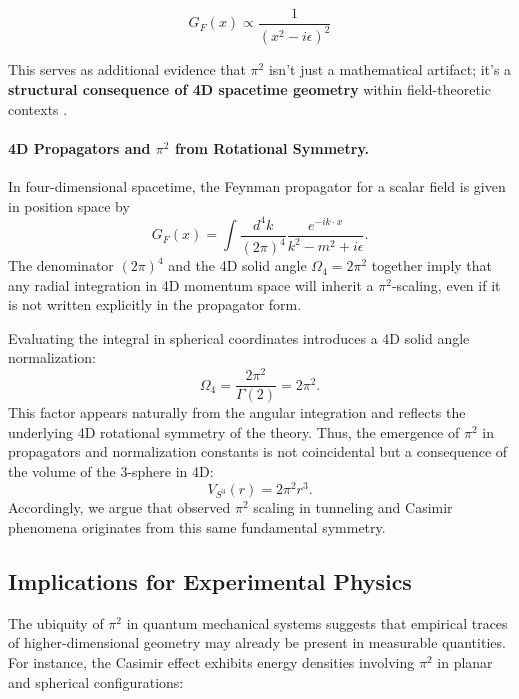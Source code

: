 \documentclass[12pt,a4paper]{article}
\begin{document}
\begin{equation}
G_F(x) \propto \frac{1}{(x^2 - i\epsilon)^2}
\end{equation}

This serves as additional evidence that $\pi^2$ isn't just a mathematical artifact; it's a \textbf{structural consequence of 4D spacetime geometry} within field-theoretic contexts \cite{peskin_introduction_1995}.

\paragraph{4D Propagators and $\pi^2$ from Rotational Symmetry.}
In four-dimensional spacetime, the Feynman propagator for a scalar field is given in position space by
\begin{equation}
G_F(x) = \int \frac{d^4k}{(2\pi)^4} \frac{e^{-i k \cdot x}}{k^2 - m^2 + i\epsilon}.
\end{equation}
The denominator \((2\pi)^4\) and the 4D solid angle \(\Omega_4 = 2\pi^2\) together imply that any radial integration in 4D momentum space will inherit a \(\pi^2\)-scaling, even if it is not written explicitly in the propagator form.

Evaluating the integral in spherical coordinates introduces a 4D solid angle normalization:
\begin{equation}
\Omega_4 = \frac{2 \pi^2}{\Gamma(2)} = 2\pi^2.
\end{equation}
This factor appears naturally from the angular integration and reflects the underlying 4D rotational symmetry of the theory. Thus, the emergence of \( \pi^2 \) in propagators and normalization constants is not coincidental but a consequence of the volume of the 3-sphere in 4D:
\begin{equation}
V_{S^3}(r) = 2\pi^2 r^3.
\end{equation}
Accordingly, we argue that observed $\pi^2$ scaling in tunneling and Casimir phenomena originates from this same fundamental symmetry.


\subsection{Implications for Experimental Physics}

The ubiquity of \(\pi^2\) in quantum mechanical systems suggests that empirical traces of higher-dimensional geometry may already be present in measurable quantities. For instance, the Casimir effect exhibits energy densities involving \(\pi^2\) in planar and spherical configurations:
\end{document}
